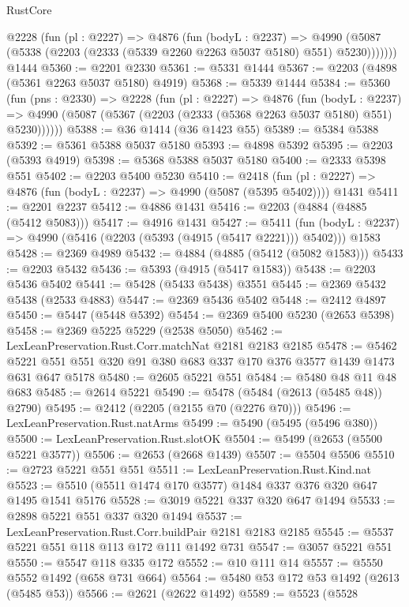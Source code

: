 \begin{lexlean}{RustCore}
\begin{coremodule}
      @2228
        (fun (pl : @2227) =>
        @4876
          (fun (bodyL : @2237) =>
          @4990 (@5087 (@5338 (@2203 (@2333 (@5339 @2260 @2263 @5037 @5180) @551) @5230)))))))
    @1444
@5360 := @2201 @2330
@5361 := @5331 @1444
@5367 := @2203 (@4898 (@5361 @2263 @5037 @5180) @4919)
@5368 := @5339 @1444
@5384 := @5360
    (fun (pns : @2330) =>
    @2228
      (fun (pl : @2227) =>
      @4876
        (fun (bodyL : @2237) =>
        @4990 (@5087 (@5367 (@2203 (@2333 (@5368 @2263 @5037 @5180) @551) @5230))))))
@5388 := @36 @1414 (@36 @1423 @55)
@5389 := @5384 @5388
@5392 := @5361 @5388 @5037 @5180
@5393 := @4898 @5392
@5395 := @2203 (@5393 @4919)
@5398 := @5368 @5388 @5037 @5180
@5400 := @2333 @5398 @551
@5402 := @2203 @5400 @5230
@5410 := @2418
    (fun (pl : @2227) => @4876 (fun (bodyL : @2237) => @4990 (@5087 (@5395 @5402))))
    @1431
@5411 := @2201 @2237
@5412 := @4886 @1431
@5416 := @2203 (@4884 (@4885 (@5412 @5083)))
@5417 := @4916 @1431
@5427 := @5411
    (fun (bodyL : @2237) => @4990 (@5416 (@2203 (@5393 (@4915 (@5417 @2221))) @5402)))
    @1583
@5428 := @2369 @4989
@5432 := @4884 (@4885 (@5412 (@5082 @1583)))
@5433 := @2203 @5432
@5436 := @5393 (@4915 (@5417 @1583))
@5438 := @2203 @5436 @5402
@5441 := @5428 (@5433 @5438) @3551
@5445 := @2369 @5432 @5438 (@2533 @4883)
@5447 := @2369 @5436 @5402
@5448 := @2412 @4897
@5450 := @5447 (@5448 @5392)
@5454 := @2369 @5400 @5230 (@2653 @5398)
@5458 := @2369 @5225 @5229 (@2538 @5050)
@5462 := LexLeanPreservation.Rust.Corr.matchNat @2181 @2183 @2185
@5478 := @5462 @5221 @551 @551 @320 @91 @380 @683 @337 @170 @376 @3577 @1439 @1473 @631 @647 @5178
@5480 := @2605 @5221 @551
@5484 := @5480 @48 @11 @48 @683
@5485 := @2614 @5221
@5490 := @5478 (@5484 (@2613 (@5485 @48)) @2790)
@5495 := @2412 (@2205 (@2155 @70 (@2276 @70)))
@5496 := LexLeanPreservation.Rust.natArms
@5499 := @5490 (@5495 (@5496 @380))
@5500 := LexLeanPreservation.Rust.slotOK
@5504 := @5499 (@2653 (@5500 @5221 @3577))
@5506 := @2653 (@2668 @1439)
@5507 := @5504 @5506
@5510 := @2723 @5221 @551 @551
@5511 := LexLeanPreservation.Rust.Kind.nat
@5523 := @5510 (@5511 @1474 @170 @3577) @1484 @337 @376 @320 @647 @1495 @1541 @5176
@5528 := @3019 @5221 @337 @320 @647 @1494
@5533 := @2898 @5221 @551 @337 @320 @1494
@5537 := LexLeanPreservation.Rust.Corr.buildPair @2181 @2183 @2185
@5545 := @5537 @5221 @551 @118 @113 @172 @111 @1492 @731
@5547 := @3057 @5221 @551
@5550 := @5547 @118 @335 @172
@5552 := @10 @111 @14
@5557 := @5550 @5552 @1492 (@658 @731 @664)
@5564 := @5480 @53 @172 @53 @1492 (@2613 (@5485 @53))
@5566 := @2621 (@2622 @1492)
@5589 := @5523
    (@5528

\end{coremodule}
\end{lexlean}
